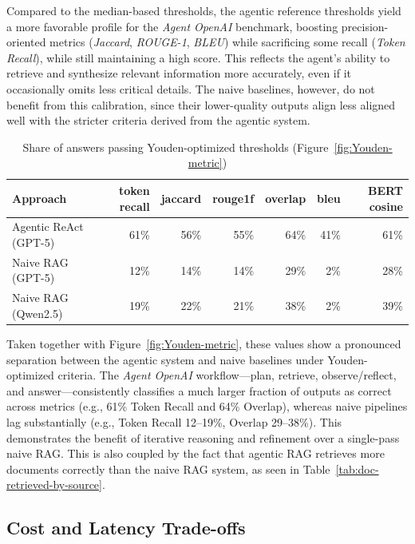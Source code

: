 Compared to the median-based thresholds, the agentic reference thresholds yield a more favorable profile for the \textit{Agent OpenAI} benchmark, boosting precision-oriented metrics (\textit{Jaccard}, \textit{ROUGE-1}, \textit{BLEU}) while sacrificing some recall (\textit{Token Recall}), while still maintaining a high score. This reflects the agent's ability to retrieve and synthesize relevant information more accurately, even if it occasionally omits less critical details. The naive baselines, however, do not benefit from this calibration, since their lower-quality outputs align less aligned well with the stricter criteria derived from the agentic system.

\begin{table}[htbp]
    \centering
    \begin{tabular}{l r r r r r r}
        \hline
        Approach & token recall & jaccard & rouge1f & overlap & bleu & \gls{BERT} cosine \\
        \hline
        Agentic ReAct (\gls{GPT}-5) & 61\% & 56\% & 55\% & 64\% & 41\% & 61\% \\
        Naive \gls{RAG} (\gls{GPT}-5) & 12\% & 14\% & 14\% & 29\% & 2\% & 28\% \\
        Naive \gls{RAG} (Qwen2.5) & 19\% & 22\% & 21\% & 38\% & 2\% & 39\% \\
        \hline
    \end{tabular}
    \caption{Share of answers passing Youden-optimized thresholds (Figure~\ref{fig:Youden-metric})}
    \label{tab:youden-metric-values}
\end{table}

Taken together with Figure~\ref{fig:Youden-metric}, these values show a pronounced separation between the agentic system and naive baselines under Youden-optimized criteria. The \textit{Agent OpenAI} workflow—plan, retrieve, observe/reflect, and answer—consistently classifies a much larger fraction of outputs as correct across metrics (e.g., 61\% Token Recall and 64\% Overlap), whereas naive pipelines lag substantially (e.g., Token Recall 12–19\%, Overlap 29–38\%). This demonstrates the benefit of iterative reasoning and refinement over a single-pass naive RAG. This is also coupled by the fact that agentic RAG retrieves more documents correctly than the naive RAG system, as seen in Table~\ref{tab:doc-retrieved-by-source}.

\subsection{Cost and Latency Trade-offs}

